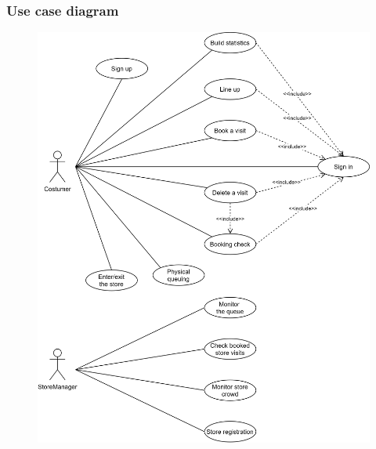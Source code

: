 \documentclass[]{article}
\begin{document}
			\subsubsection{Use case diagram}
			\begin{figure}[H]
				\centering
				\includegraphics[scale=1.1]{usecasediagram.png}
				\caption{}
				\label{fig:usecasediagram}
			\end{figure}
					
\end{document}
